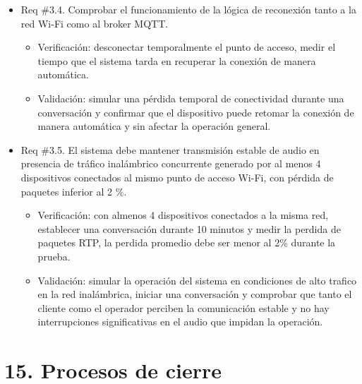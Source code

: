 \documentclass[
11pt, %
]{charter}
\begin{document}
\begin{itemize}
	\item Req \#3.4. Comprobar el funcionamiento de la lógica de reconexión tanto a la red Wi-Fi como al broker MQTT.
	\begin{itemize}
		\item Verificación: desconectar temporalmente el punto de acceso, medir el tiempo que el sistema tarda en recuperar la conexión de manera automática.
		\item Validación: simular una pérdida temporal de conectividad durante una conversación y confirmar que el dispositivo puede retomar la conexión de manera automática y sin afectar la operación general.
	\end{itemize}

	\item Req \#3.5. El sistema debe mantener transmisión estable de audio en presencia de tráfico inalámbrico concurrente generado por al menos 4 dispositivos conectados al mismo punto de acceso Wi-Fi, con pérdida de paquetes inferior al 2 \%.
	\begin{itemize}
		\item Verificación: con almenos 4 dispositivos conectados a la misma red, establecer una conversación durante 10 minutos y medir la perdida de paquetes RTP, la perdida promedio debe ser menor al 2\% durante la prueba.
		\item Validación: simular la operación del sistema en condiciones de alto trafico en la red inalámbrica, iniciar una conversación y comprobar que tanto el cliente como el operador perciben la comunicación estable y no hay interrupciones significativas en el audio que impidan la operación.
	\end{itemize}		
	
\end{itemize}

\section{15. Procesos de cierre}    
\label{sec:cierre}
\end{document}
